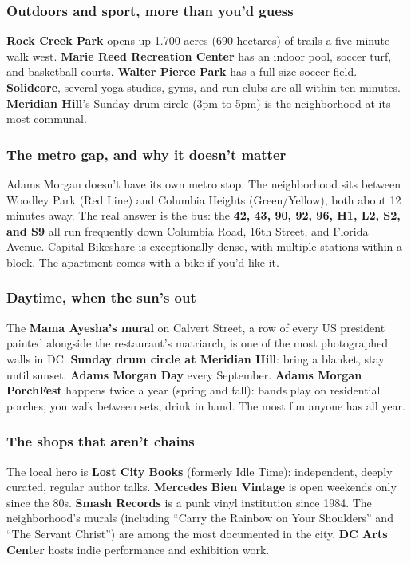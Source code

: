 \documentclass[11pt,a4paper]{article}
\begin{document}
\subsubsection*{Outdoors and sport, more than you'd guess}
\textbf{Rock Creek Park} opens up 1.700 acres (690 hectares) of trails a five-minute walk west. \textbf{Marie Reed Recreation Center} has an indoor pool, soccer turf, and basketball courts. \textbf{Walter Pierce Park} has a full-size soccer field. \textbf{Solidcore}, several yoga studios, gyms, and run clubs are all within ten minutes. \textbf{Meridian Hill}'s Sunday drum circle (3pm to 5pm) is the neighborhood at its most communal.

\subsubsection*{The metro gap, and why it doesn't matter}
Adams Morgan doesn't have its own metro stop. The neighborhood sits between Woodley Park (Red Line) and Columbia Heights (Green/Yellow), both about 12 minutes away. The real answer is the bus: the \textbf{42, 43, 90, 92, 96, H1, L2, S2, and S9} all run frequently down Columbia Road, 16th Street, and Florida Avenue. Capital Bikeshare is exceptionally dense, with multiple stations within a block. The apartment comes with a bike if you'd like it.

\subsubsection*{Daytime, when the sun's out}
The \textbf{Mama Ayesha's mural} on Calvert Street, a row of every US president painted alongside the restaurant's matriarch, is one of the most photographed walls in DC. \textbf{Sunday drum circle at Meridian Hill}: bring a blanket, stay until sunset. \textbf{Adams Morgan Day} every September. \textbf{Adams Morgan PorchFest} happens twice a year (spring and fall): bands play on residential porches, you walk between sets, drink in hand. The most fun anyone has all year.

\subsubsection*{The shops that aren't chains}
The local hero is \textbf{Lost City Books} (formerly Idle Time): independent, deeply curated, regular author talks. \textbf{Mercedes Bien Vintage} is open weekends only since the 80s. \textbf{Smash Records} is a punk vinyl institution since 1984. The neighborhood's murals (including ``Carry the Rainbow on Your Shoulders'' and ``The Servant Christ'') are among the most documented in the city. \textbf{DC Arts Center} hosts indie performance and exhibition work.
\end{document}
